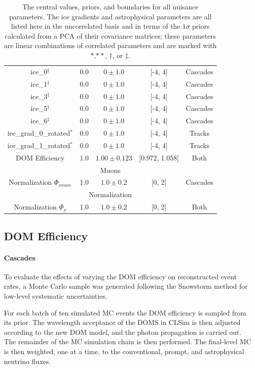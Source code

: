 \documentclass[main.tex]{subfiles}
\begin{document}
\begin{table}
\begin{tabular}{c | cccc}
        ice\_0$^{\ddag}$ & 0.0 & $0\pm 1.0$ & [-4, 4]&Cascades \\
        ice\_1$^{\ddag}$ & 0.0 & $0\pm 1.0$ & [-4, 4]&Cascades \\
        ice\_3$^{\ddag}$ & 0.0 & $0\pm 1.0$ & [-4, 4]&Cascades \\
        ice\_5$^{\ddag}$ & 0.0 & $0\pm 1.0$ & [-4, 4]&Cascades \\
        ice\_6$^{\ddag}$ & 0.0 & $0\pm 1.0$ & [-4, 4]&Cascades \\
        ice\_grad\_0\_rotated$^{*}$ & 0.0 & $0\pm 1.0$ & [-4, 4] & Tracks  \\
        ice\_grad\_1\_rotated$^{*}$ & 0.0 & $0\pm 1.0$ & [-4, 4]& Tracks  \\
        DOM Efficiency & 1.0 & $1.00\pm0.123$ & [0.972, 1.058] & Both \\
        \multicolumn{5}{c}{Muons} \\\hline
        Normalization $\Phi_{muon}$ & 1.0 & $1.0\pm0.2$ & [0, 2] & Cascades  \\       
        \multicolumn{5}{c}{Normalization} \\\hline
        Normalization $\Phi_{\nu}$ & 1.0 & $1.0\pm0.2$ & [0, 2] & Both \\       
    \end{tabular}
    \caption{The central values, priors, and boundaries for all nuisance parameters. The ice gradients and astrophysical parameters are all listed here in the uncorrelated basis and in terms of the $1\sigma$ priors calculated from a PCA of their covariance matrices; these parameters are linear combinations of correlated parameters and are marked with $*$,$**$, $\dag$, or $\ddag$.}\label{table:daemon_table}
\end{table}


\subsection{DOM Efficiency}\label{subsect:domeff}

\paragraph{Cascades}

To evaluate the effects of varying the DOM efficiency on reconstructed event rates, a Monte Carlo sample was generated following the Snowstorm method for low-level systematic uncertainties.

For each batch of ten simulated MC events the DOM efficiency is sampled from its prior. 
The wavelength acceptance of the DOMS in CLSim is then adjusted according to the new DOM model, and the photon propagation is carried out. 
The remainder of the MC simulation chain is then performed.
The final-level MC is then weighted, one at a time, to the conventional, prompt, and astrophysical neutrino fluxes. 
\end{document}
